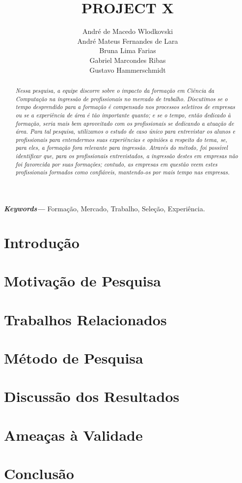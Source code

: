 \documentclass[onecolumn,14pt]{asme2ej}
\title{ PROJECT X }
\author{
    André de Macedo Wlodkovski \\ 
    André Mateus Fernandes de Lara \\ 
    Bruna Lima Farias \\ 
    Gabriel Marcondes Ribas \\
    Gustavo Hammerschmidt \\

}
\providecommand{\keywords}[1]{\small\textbf{\textit{Keywords---}} #1}
\begin{document}
\maketitle

\begin{abstract} 
{\it Nessa pesquisa, a equipe discorre sobre o impacto da formação em Ciência da Computação na ingressão de profissionais no mercado de trabalho. Discutimos se o tempo desprendido para a formação é compensado nos processos seletivos de empresas ou se a experiência de área é tão importante quanto; e se o tempo, então dedicado à formação, seria mais bem aproveitado com os profissionais se dedicando a atuação de área. Para tal pesquisa, utilizamos o estudo de caso único para entrevistar os alunos e profissionais para entendermos suas experiências e opiniões a respeito do tema, se, para eles, a formação fora relevante para ingressão. Através do método, foi possível identificar que, para os profissionais entrevistados, a ingressão destes em empresas não foi favorecida por suas formações; contudo, as empresas em questão veem estes profissionais formados como confiáveis, mantendo-os por mais tempo nas empresas. }
\end{abstract}
\keywords{Formação, Mercado, Trabalho, Seleção, Experiência.}

\section{Introdução} 



\section{Motivação de Pesquisa} 



\section{Trabalhos Relacionados} 



\section{Método de Pesquisa} 



\section{Discussão dos Resultados} 

\section{Ameaças à Validade} 

\section{Conclusão} 

\printbibliography
\end{document}
